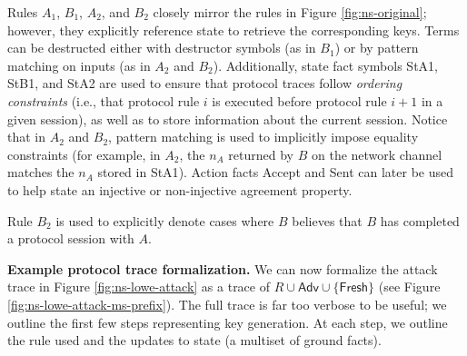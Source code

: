 \documentclass{article}
\theoremstyle{definition}
\begin{document}
Rules $A_1$, $B_1$, $A_2$, and $B_2$ closely mirror the rules in Figure \ref{fig:ns-original}; 
however, they explicitly reference state to retrieve the corresponding keys. 
Terms can be destructed either with destructor symbols (as in $B_1$) or by pattern 
matching on inputs (as in $A_2$ and $B_2$).
Additionally, state fact symbols \textsf{StA1}, \textsf{StB1}, and \textsf{StA2} 
are used to ensure that protocol traces follow \textit{ordering constraints} 
(i.e., that protocol rule $i$ is executed before protocol rule $i+1$ in a given session), 
as well as to store information about the current session.
Notice that in $A_2$ and $B_2$, pattern matching is used to implicitly impose 
equality constraints (for example, in $A_2$, the $n_A$ returned by $B$ on the network channel matches the $n_A$ 
stored in \textsf{StA1}).
Action facts \textsf{Accept} and \textsf{Sent} can later be used to help state 
an injective or non-injective agreement property.

Rule $B_2$ is used to explicitly denote cases where $B$ believes that $B$ has 
completed a protocol session with $A$. 

\textbf{Example protocol trace formalization.}
We can now formalize the attack trace in Figure \ref{fig:ns-lowe-attack} as a trace of $R \cup \mathsf{Adv} \cup \{ \mathsf{Fresh} \}$ (see Figure \ref{fig:ns-lowe-attack-ms-prefix}). 
The full trace is far too verbose 
to be useful; 
we outline the first few steps representing key generation. 
At each step, we outline the rule used and the updates to state (a multiset of ground facts).
\end{document}
